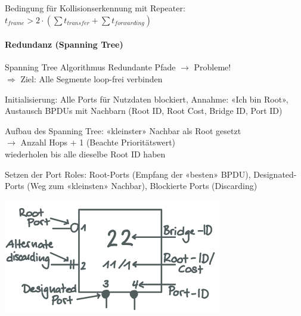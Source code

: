 \begin{remark}
    Bedingung für Kollisionserkennung mit Repeater: $t_{frame} > 2 \cdot (\sum t_{transfer} + \sum t_{forwarding})$
\end{remark}

\paragraph{Redundanz (Spanning Tree)}

\begin{KR}{Spanning Tree Algorithmus}
    Redundante Pfade $\rightarrow$ Probleme! \\$\Rightarrow$ Ziel: Alle Segmente loop-frei verbinden

    \vspace{1mm}
    
        Initialisierung: Alle Ports für Nutzdaten blockiert, Annahme: «Ich bin Root», Austausch BPDUs mit Nachbarn (Root ID, Root Cost, Bridge ID, Port ID)
    
    \vspace{1mm}

    Aufbau des Spanning Tree: «kleinster» Nachbar als Root gesetzt \\ $\rightarrow$ Anzahl Hops + 1 (Beachte Prioritätswert)\\
    wiederholen bis alle dieselbe Root ID haben
    
    \vspace{1mm}

    \begin{minipage}{0.6\linewidth}
    Setzen der Port Roles: Root-Ports (Empfang der «besten» BPDU), Designated-Ports (Weg zum «kleinsten» Nachbar), Blockierte Ports (Discarding)
\end{minipage}
\hspace{1mm}
    \begin{minipage}{0.37\linewidth}
        \includegraphics[width=1\linewidth]{images/spanning_tree_algorithmus.png}
    \end{minipage}
\end{KR}

